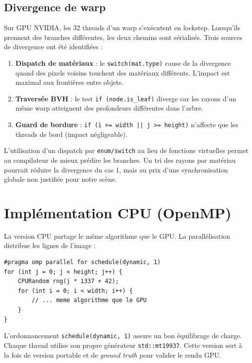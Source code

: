 \documentclass[12pt,a4paper]{article}
\begin{document}
\subsection{Divergence de warp}

Sur GPU NVIDIA, les 32 threads d'un warp s'exécutent en lockstep. Lorsqu'ils prennent des branches différentes, les deux chemins sont sérialisés. Trois sources de divergence ont été identifiées :

\begin{enumerate}
    \item \textbf{Dispatch de matériaux} : le \texttt{switch(mat.type)} cause de la divergence quand des pixels voisins touchent des matériaux différents. L'impact est maximal aux frontières entre objets.
    \item \textbf{Traversée BVH} : le test \texttt{if (node.is\_leaf)} diverge car les rayons d'un même warp atteignent des profondeurs différentes dans l'arbre.
    \item \textbf{Guard de bordure} : \texttt{if (i >= width || j >= height)} n'affecte que les threads de bord (impact négligeable).
\end{enumerate}

L'utilisation d'un dispatch par \texttt{enum/switch} au lieu de fonctions virtuelles permet au compilateur de mieux prédire les branches. Un tri des rayons par matériau pourrait réduire la divergence du cas 1, mais au prix d'une synchronisation globale non justifiée pour notre scène.

\section{Implémentation CPU (OpenMP)}

La version CPU partage le même algorithme que le GPU. La parallélisation distribue les lignes de l'image :

\begin{lstlisting}[caption={Parallélisation OpenMP}]
#pragma omp parallel for schedule(dynamic, 1)
for (int j = 0; j < height; j++) {
    CPURandom rng(j * 1337 + 42);
    for (int i = 0; i < width; i++) {
        // ... meme algorithme que le GPU
    }
}
\end{lstlisting}

L'ordonnancement \texttt{schedule(dynamic, 1)} assure un bon équilibrage de charge. Chaque thread utilise son propre générateur \texttt{std::mt19937}. Cette version sert à la fois de version portable et de \textit{ground truth} pour valider le rendu GPU.
\end{document}
